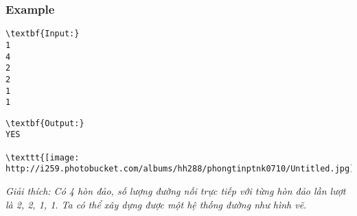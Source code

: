 \subsubsection{Example}
\begin{verbatim}
\textbf{Input:}
1
4
2
2
1
1\end{verbatim}
\begin{verbatim}
\textbf{Output:}
YES

\texttt{[image: http://i259.photobucket.com/albums/hh288/phongtinptnk0710/Untitled.jpg]}\end{verbatim}

\emph{Giải thích: Có 4 hòn đảo, số lượng đường nối trực tiếp với từng hòn đảo lần lượt là 2, 2, 1, 1. Ta có thể xây dựng được một hệ thống đường như hình vẽ. }